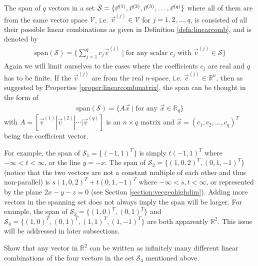 \begin{defn}[Span]
\label{defn:span}
The span of $q$ vectors in a set $\mathcal{S} = \{\vec{v}^{(1)}, \vec{v}^{(2)}, \vec{v}^{(3)}, \ldots, \\ \vec{v}^{(q)}\}$ where all of them are from the same vector space $\mathcal{V}$, i.e. $\vec{v}^{(j)} \in \mathcal{V}$ for $j = 1, 2, \ldots, q$, is consisted of all their possible linear combinations as given in Definition \ref{defn:linearcomb}, and is denoted by
\begin{align*}
\text{span}(\mathcal{S}) = \{\sum_{j=1}^{q} c_j\vec{v}^{(j)} \mid \text{for any scalar $c_j$ with $\vec{v}^{(j)} \in \mathcal{S}$}\}
\end{align*}
Again we will limit ourselves to the cases where the coefficients $c_j$ are real and $q$ has to be finite. If the $\vec{v}^{(j)}$ are from the real $n$-space, i.e. $\vec{v}^{(j)} \in \mathbb{R}^n$, then as suggested by Properties \ref{proper:linearcombmatrix}, the span can be thought in the form of 
\begin{align*}
\text{span}(\mathcal{S}) = \{A\vec{x} \mid \text{for any } \vec{x} \in \mathbb{R}_q\}
\end{align*}
with $A = [\vec{v}^{(1)}|\vec{v}^{(2)}|\cdots|\vec{v}^{(q)}]$ is an $n \times q$ matrix and
$\vec{x} = (c_1, c_2, \ldots, c_q)^T$ being the coefficient vector.
\end{defn}
For example, the span of $\mathcal{S}_1 = \{(-1,1)^T\}$ is simply $t(-1,1)^T$ where $-\infty < t < \infty$, or the line $y = -x$. The span of $\mathcal{S}_2 = \{(1,0,2)^T, (0,1,-1)^T\}$ (notice that the two vectors are not a constant multiple of each other and thus non-parallel) is $s(1,0,2)^T + t(0,1,-1)^T$ where $-\infty < s,t < \infty$, or represented by the plane $2x - y - z = 0$ (see Section \ref{section:vecgeohighdim}). Adding more vectors in the spanning set does not always imply the span will be larger. For example, the span of $\mathcal{S}_3 = \{(1,0)^T, (0,1)^T\}$ and $\mathcal{S}_4 = \{(1,0)^T, (0,1)^T, (1,1)^T, (1,-1)^T\}$ are both apparently $\mathbb{R}^2$. This issue will be addressed in later subsections.
\begin{exmp}
\label{exmp:S3S4}
Show that any vector in $\mathbb{R}^2$ can be written as infinitely many different linear combinations of the four vectors in the set $\mathcal{S}_4$ mentioned above.
\end{exmp}
